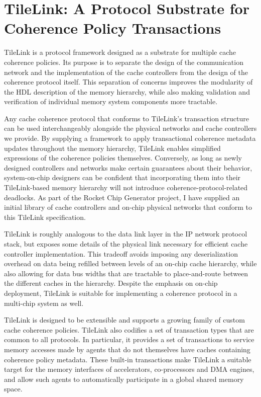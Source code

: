 \chapter{TileLink: A Protocol Substrate for Coherence Policy Transactions }
\label{c.tilelink}

TileLink is a protocol framework designed as a substrate for multiple cache coherence policies.
Its purpose is to separate the design of the communication network and the implementation of the cache controllers from the design of the coherence protocol itself.
This separation of concerns improves the modularity of the HDL description of the memory hierarchy,
while also making validation and verification of individual memory system components more tractable.

Any cache coherence protocol that conforms to TileLink's transaction structure can be used interchangeably alongside the physical networks and cache controllers we provide.
By supplying a framework to apply transactional coherence metadata updates throughout the memory hierarchy, TileLink enables simplified expressions of the coherence policies themselves.
Conversely, as long as newly designed controllers and networks make certain guarantees about their behavior,
system-on-chip designers can be confident that incorporating them into their TileLink-based memory hierarchy will not introduce coherence-protocol-related deadlocks.
As part of the Rocket Chip Generator project, I have supplied an initial library of cache controllers and on-chip physical networks that conform to this TileLink specification.

TileLink is roughly analogous to the data link layer in the IP network protocol stack, but exposes some details of the physical link necessary for efficient cache controller implementation.
This tradeoff avoids imposing any deserialization overhead on data being refilled between levels of an on-chip cache hierarchy, while also allowing for data bus widths
that are tractable to place-and-route between the different caches in the hierarchy.
Despite the emphasis on on-chip deployment, TileLink is suitable for implementing a coherence protocol in a multi-chip system as well.

TileLink is designed to be extensible and supports a growing family of custom cache coherence policies.
TileLink also codifies a set of transaction types that are common to all protocols.
In particular, it provides a set of transactions to service memory accesses made by agents that do not themselves have caches containing coherence policy metadata.
These built-in transactions make TileLink a suitable target for the memory interfaces of accelerators, co-processors and DMA engines,
and allow such agents to automatically participate in a global shared memory space.


